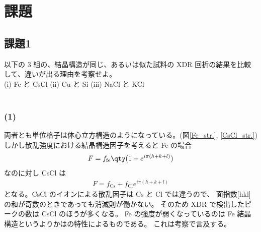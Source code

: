 \documentclass[11pt,dvipdfmx,a4paper]{jsarticle}
\begin{document}
\section{課題}
\subsection*{課題1}
以下の 3 組の、結晶構造が同じ、あるいは似た試料の XDR 回折の結果を比較して、違いが出る理由を考察せよ。\\
(i) Fe と CsCl \quad (ii) Cu と Si \quad (iii) NaCl と KCl\\ \\

\subsubsection*{(1)}
両者とも単位格子は体心立方構造のようになっている。(図\ref{Fe_str.}, \ref{CsCl_str.})
しかし散乱強度における結晶構造因子を考えると Fe の場合
\begin{align}
	F = f_{\text{fe}}\qty(1+e^{i\pi(h+k+l)})
\end{align}
なのに対し CsCl は
\begin{align}
	F = f_{\text{Cs}}+f_{\text{Cl}}e^{i\pi(h+k+l)}
\end{align}
となる。CsCl のイオンによる散乱因子は Cs と Cl では違うので、
面指数[hkl] の和が奇数のときであっても消滅則が働かない。
そのため XDR で検出したピークの数は CsCl のほうが多くなる。%
Fe の強度が弱くなっているのは Fe 結晶構造というよりかはの特性によるものである。
これは考察で言及する。\\ %

\end{document}
